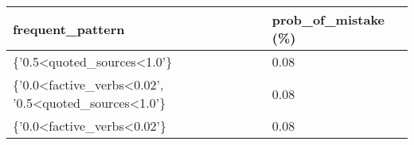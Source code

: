 \begin{tabular}{|l|l|}
\hline
\textbf{frequent\_pattern}                                                                         & \textbf{prob\_of\_mistake (\%)} \\ \hline
\{'0.5\textless{}quoted\_sources\textless{}1.0'\}                                                  & 0.08                       \\ \hline
\{'0.0\textless{}factive\_verbs\textless{}0.02',   '0.5\textless{}quoted\_sources\textless{}1.0'\} & 0.08                       \\ \hline
\{'0.0\textless{}factive\_verbs\textless{}0.02'\}                                                  & 0.08                       \\ \hline
\end{tabular}